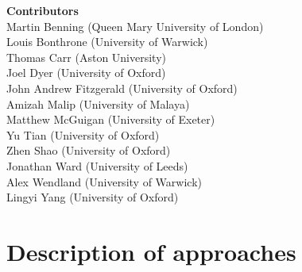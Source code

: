 \documentclass[12pt]{article}
\begin{document}
\newpage
\begin{center}
    \large\textbf{Contributors}\\
    \vskip1cm
    \normalsize Martin Benning (Queen Mary University of London)\\
    \normalsize Louis Bonthrone (University of Warwick)\\
    \normalsize Thomas Carr (Aston University)\\
    \normalsize Joel Dyer (University of Oxford)\\
    \normalsize John Andrew Fitzgerald (University of Oxford)\\
    \normalsize Amizah Malip (University of Malaya)\\
    \normalsize Matthew McGuigan (University of Exeter)\\
    \normalsize Yu Tian (University of Oxford)\\
    \normalsize Zhen Shao (University of Oxford)\\
    \normalsize Jonathan Ward (University of Leeds)\\
    \normalsize Alex Wendland (University of Warwick)\\
    \normalsize Lingyi Yang (University of Oxford)
\end{center}
\newpage

\tableofcontents
\newpage










\section{Description of approaches}\label{sec:descriptionofapproaches}
\end{document}
